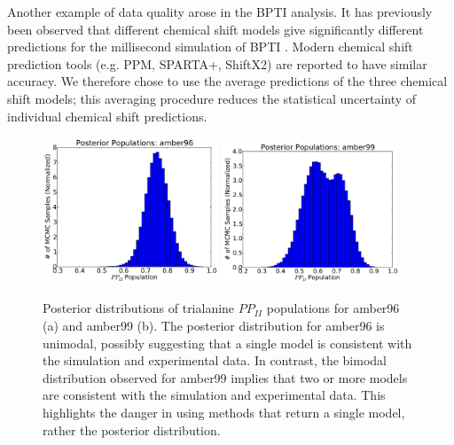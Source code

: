 \documentclass[journal=jacsat,manuscript=article]{achemso}
\begin{document}
Another example of data quality arose in the BPTI analysis.  It has previously been observed that different chemical shift models give significantly different predictions for the millisecond simulation of BPTI \cite{xue2012microsecond}.  Modern chemical shift prediction tools (e.g. PPM, SPARTA+, ShiftX2) are reported to have similar accuracy.  We therefore chose to use the average predictions of the three chemical shift models; this averaging procedure reduces the statistical uncertainty of individual chemical shift predictions.  

\newpage 

\begin{figure}

\includegraphics[width=5.25cm]{figures/ALA3_amber96_PPII_MCMC.pdf}
\includegraphics[width=5.25cm]{figures/ALA3_amber99_PPII_MCMC.pdf}

\caption{
Posterior distributions of trialanine $PP_{II}$ populations for amber96 (a) and amber99 (b).  The posterior distribution for amber96 is unimodal, possibly suggesting that a single model is consistent with the simulation and experimental data.  In contrast, the bimodal distribution observed for amber99 implies that two or more models are consistent with the simulation and experimental data.  This highlights the danger in using methods that return a single model, rather the posterior distribution.  
}
\label{figure:ALA3_rama}
\end{figure}

\newpage
\end{document}
